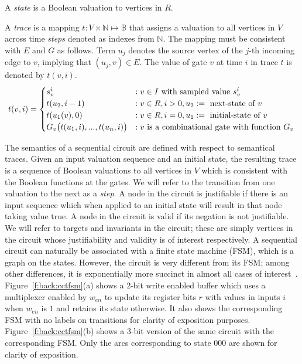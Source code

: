 \begin{definition}[State]
\rm A {\em state} is a Boolean valuation to vertices in $R$. 
\end{definition}

\begin{definition}[Trace]
\rm A {\em trace} is a mapping $t: V \times \mathbb{N} \mapsto
\mathbb{B}$ that assigns a valuation to all vertices in
$V$ across time {\em steps} denoted as indexes from
$\mathbb{N}$.  The mapping must be consistent with $E$ and
$G$ as follows.  Term $u_{j}$ denotes the source vertex of
the $j$-th incoming edge to $v$, implying that
$(u_{j},v)\in E$.  The value of gate $v$ at time $i$ in
trace $t$ is denoted by $t(v,i)$.
\[
t(v,i)=
   \begin{cases}
      s^i_{v}            &:v \in I \ \text{with sampled value $s_{v}^i$}\\
      t(u_2, i-1)        &:v \in R,i>0,u_2:=\ \text{next-state of $v$}\\
      t(u_1(v), 0)       &:v \in R,i=0,u_1:=\ \text{initial-state of $v$}\\
      G_v\big(t(u_{1},i),...,t(u_{n},i)\big) &: v \ \text{is a combinational gate with function 
$G_v$}
   \end{cases} \\
\]
\end{definition}

The semantics of a sequential circuit are defined with
respect to semantical traces.  Given an input valuation
sequence and an initial state, the resulting trace is a
sequence of Boolean valuations to all vertices in $V$
which is consistent with the Boolean functions at the
gates.  We will refer to the transition from one valuation
to the next as a {\em step}.  A node in the circuit is
justifiable if there is an input sequence which when
applied to an initial state will result in that node
taking value $\mbox{true}$.  A node in the circuit is
valid if its negation is not justifiable.  We will refer
to targets and invariants in the circuit; these are simply
vertices in the circuit whose justifiability and validity
is of interest respectively.
A sequential circuit can naturally
be associated with a finite state machine (FSM),
which is a graph on the states.  However, the 
circuit is very different from its FSM; among
other differences, it is exponentially more succinct in
almost all cases of interest~\cite{BuClMcDiHw92}. 
Figure~\ref{f:back:cctfsm}(a) shows a 2-bit write enabled 
buffer which uses a multiplexer enabled by $w_{en}$ to 
update its register bits $r$ with values in inputs $i$ 
when $w_{en}$ is $1$ and retains its state otherwise.
It also shows the corresponding FSM with no labels on
transitions for clarity of exposition purposes.
Figure~\ref{f:back:cctfsm}(b) shows a 3-bit version of 
the same circuit with the corresponding FSM. 
Only the arcs corresponding to state $000$ are shown for 
clarity of exposition.


